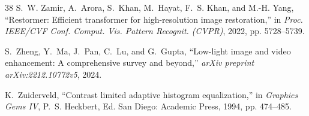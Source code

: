 \documentclass[journal]{IEEEtran}
\begin{document}
\begin{thebibliography}{38}
S.~W. Zamir, A.~Arora, S.~Khan, M.~Hayat, F.~S. Khan, and M.-H. Yang, ``Restormer: Efficient transformer for high-resolution image restoration,'' in \emph{Proc. IEEE/CVF Conf. Comput. Vis. Pattern Recognit. (CVPR)}, 2022, pp. 5728--5739.

S.~Zheng, Y.~Ma, J.~Pan, C.~Lu, and G.~Gupta, ``Low-light image and video enhancement: A comprehensive survey and beyond,'' \emph{arXiv preprint arXiv:2212.10772v5}, 2024.

K.~Zuiderveld, ``Contrast limited adaptive histogram equalization,'' in \emph{Graphics Gems IV}, P.~S. Heckbert, Ed. San Diego: Academic Press, 1994, pp. 474--485.

\end{thebibliography}
\end{document}
